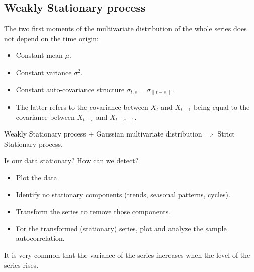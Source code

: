 \subsection{Weakly Stationary process}
The two first moments of the multivariate distribution of the whole series
does not depend on the time origin:
\begin{itemize}
    \item Constant mean $\mu$.
    \item Constant variance $\sigma^2$.
    \item Constant auto-covariance structure $\sigma_{t,s} = \sigma_{\lVert t - s \rVert}$.
    \item The latter refers to the covariance between $X_t$ and $X_{t-1}$ being equal to 
        the covariance between $X_{t-s}$ and $X_{t-s-1}$.
\end{itemize}

Weakly Stationary process + Gaussian multivariate distribution $\Longrightarrow$ Strict Stationary process.

\begin{question}{Is our data stationary? How can we detect?}{}
    \begin{itemize}
        \item Plot the data.
        \item Identify no stationary components (trends, seasonal patterns, cycles).
        \item Transform the series to remove those components.
        \item For the transformed (stationary) series, plot and analyze the sample autocorrelation.
    \end{itemize}
\end{question}

\begin{marker}
    It is very common that the variance of the series increases when the level of the series rises.
\end{marker}


